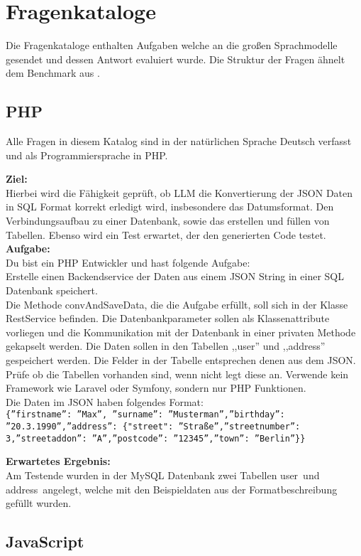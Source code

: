 \section{Fragenkataloge}
Die Fragenkataloge enthalten Aufgaben welche an die großen Sprachmodelle gesendet und dessen Antwort evaluiert wurde. Die Struktur der Fragen ähnelt dem Benchmark aus \cite{peng-2024}.

\subsection{PHP}
Alle Fragen in diesem Katalog sind in der natürlichen Sprache Deutsch verfasst und als Programmiersprache in PHP.

\begin{tcolorbox}[
	enhanced,
	colback=white,
	coltitle=black,
	colbacktitle=white,
	title= php/f0 - JSON Informationen in einer MySQL speichern
	]
	\textbf{Ziel:}\\
	Hierbei wird die Fähigkeit geprüft, ob LLM die Konvertierung der JSON Daten in SQL Format korrekt erledigt wird, insbesondere das Datumsformat. Den Verbindungsaufbau zu einer Datenbank, sowie das erstellen und füllen von Tabellen. Ebenso wird ein Test erwartet, der den generierten Code testet.\\
	\textbf{Aufgabe:}\\
	Du bist ein PHP Entwickler und hast folgende Aufgabe:\\
	Erstelle einen Backendservice der Daten aus einem JSON String in einer SQL Datenbank speichert.\\
	Die Methode convAndSaveData, die die Aufgabe erfüllt, soll sich in der Klasse RestService befinden. Die Datenbankparameter sollen als Klassenattribute vorliegen und die Kommunikation mit der Datenbank in einer privaten Methode gekapselt werden. Die Daten sollen in den Tabellen ,,user'' und ,,address'' gespeichert werden. Die Felder in der Tabelle entsprechen denen aus dem JSON. Prüfe ob die Tabellen vorhanden sind, wenn nicht legt diese an. Verwende kein Framework wie Laravel oder Symfony, sondern nur PHP Funktionen.\\
	Die Daten im JSON haben folgendes Format:\\
	\texttt{\{''firstname'':  ''Max'', ''surname'': ''Musterman'',''birthday'': ''20.3.1990'',''address'': \{"street": ''Straße'',''streetnumber'': 3,''streetaddon'': ''A'',''postcode'': ''12345'',''town'': ''Berlin''\}\}}

	\textbf{Erwartetes Ergebnis:}\\
	Am Testende wurden in der MySQL Datenbank zwei Tabellen \glqq user\grqq \ und \glqq address\grqq \ angelegt, welche mit den Beispieldaten aus der Formatbeschreibung gefüllt wurden.
\end{tcolorbox}


\subsection{JavaScript}
